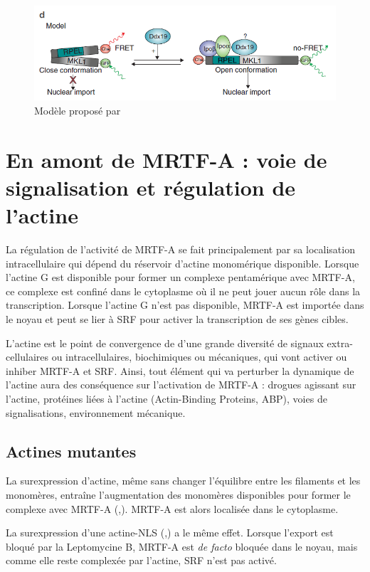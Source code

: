 \documentclass{report}
\begin{document}
\begin{figure}[h!]
\includegraphics[scale=0.5]{Ddx19.png}
\caption{Modèle proposé par \cite{rajakyla_rna_2015}}
\end{figure}



\section{En amont de MRTF-A : voie de signalisation et régulation de l'actine} 


La régulation de l'activité de MRTF-A se fait principalement par sa localisation intracellulaire qui dépend du réservoir d'actine monomérique disponible. 
Lorsque l'actine G est disponible pour former un complexe pentamérique avec MRTF-A, ce complexe est confiné dans le cytoplasme où il ne peut jouer aucun rôle dans la transcription. 
Lorsque l'actine G n'est pas disponible, MRTF-A est importée dans le noyau et peut se lier à SRF pour activer la transcription de ses gènes cibles. 

L'actine est le point de convergence de d'une grande diversité de signaux extra-cellulaires ou intracellulaires, biochimiques ou mécaniques, qui vont activer ou inhiber MRTF-A et SRF. 
Ainsi, tout élément qui va perturber la dynamique de l'actine aura des conséquence sur l'activation de MRTF-A : drogues agissant sur l'actine, protéines liées à l'actine (Actin-Binding Proteins, ABP), voies de signalisations, environnement mécanique. 


\subsection{Actines mutantes}

La surexpression d'actine, même sans changer l'équilibre entre les filaments et les monomères, entraîne l'augmentation des monomères disponibles pour former le complexe avec MRTF-A (\cite{miralles_actin_2003},\cite{vartiainen_nuclear_2007}). MRTF-A est alors localisée dans le cytoplasme. 

La surexpression d'une actine-NLS (\cite{vartiainen_nuclear_2007},\cite{posern_mutant_2002}) a le même effet. Lorsque l'export est bloqué par la Leptomycine B, MRTF-A est \emph{de facto} bloquée dans le noyau, mais comme elle reste complexée par l'actine, SRF n'est pas activé. 
\end{document}

